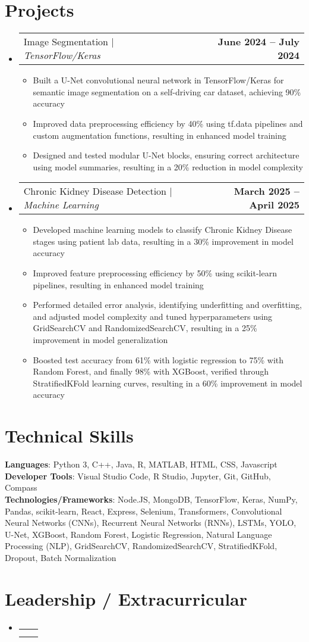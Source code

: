 \documentclass[letterpaper,11pt]{article}
\makeatletter
\newcommand{\resumeItem}[1]{\item\small{#1 \vspace{-2pt}}}
\newcommand{\resumeSubheading}[4]{
  \vspace{-2pt}\item
  \begin{tabular*}{1.0\textwidth}[t]{l@{\extracolsep{\fill}}r}
    \textbf{#1} & \textbf{\small #2} \\
    \textit{\small#3} & \textit{\small #4} \\
  \end{tabular*}\vspace{-7pt}
}
\newcommand{\resumeProjectHeading}[2]{
    \item
    \begin{tabular*}{1.0\textwidth}{l@{\extracolsep{\fill}}r}
      \small#1 & \textbf{\small #2}\\
    \end{tabular*}\vspace{-7pt}
}
\newcommand{\resumeItemListStart}{\begin{itemize}}
\newcommand{\resumeItemListEnd}{\end{itemize}\vspace{-5pt}}
\newcommand{\resumeSubHeadingListStart}{\begin{itemize}[leftmargin=0.0in, label={}]}
\newcommand{\resumeSubHeadingListEnd}{\end{itemize}}
\makeatother
\begin{document}
\section{Projects}
\resumeSubHeadingListStart
  \resumeProjectHeading
      {Image Segmentation | \emph{TensorFlow/Keras}}{June 2024 -- July 2024}
      \resumeItemListStart
        \resumeItem{Built a U-Net convolutional neural network in TensorFlow/Keras for semantic image segmentation on a self-driving car dataset, achieving 90\% accuracy}
        \resumeItem{Improved data preprocessing efficiency by 40\% using tf.data pipelines and custom augmentation functions, resulting in enhanced model training}
        \resumeItem{Designed and tested modular U-Net blocks, ensuring correct architecture using model summaries, resulting in a 20\% reduction in model complexity}
      \resumeItemListEnd
  \resumeProjectHeading
      {Chronic Kidney Disease Detection | \emph{Machine Learning}}{March 2025 -- April 2025}
      \resumeItemListStart
        \resumeItem{Developed machine learning models to classify Chronic Kidney Disease stages using patient lab data, resulting in a 30\% improvement in model accuracy}
        \resumeItem{Improved feature preprocessing efficiency by 50\% using scikit-learn pipelines, resulting in enhanced model training}
        \resumeItem{Performed detailed error analysis, identifying underfitting and overfitting, and adjusted model complexity and tuned hyperparameters using GridSearchCV and RandomizedSearchCV, resulting in a 25\% improvement in model generalization}
        \resumeItem{Boosted test accuracy from 61\% with logistic regression to 75\% with Random Forest, and finally 98\% with XGBoost, verified through StratifiedKFold learning curves, resulting in a 60\% improvement in model accuracy}
      \resumeItemListEnd
\resumeSubHeadingListEnd

\section{Technical Skills}
\begin{itemize}[leftmargin=0.15in, label={}]
    \small{\item{
     \textbf{Languages}{: Python 3, C++, Java, R, MATLAB, HTML, CSS, Javascript} \\
     \textbf{Developer Tools}{: Visual Studio Code, R Studio, Jupyter, Git, GitHub, Compass} \\
     \textbf{Technologies/Frameworks}{: Node.JS, MongoDB, TensorFlow, Keras, NumPy, Pandas, scikit-learn, React, Express, Selenium, Transformers, Convolutional Neural Networks (CNNs), Recurrent Neural Networks (RNNs), LSTMs, YOLO, U-Net, XGBoost, Random Forest, Logistic Regression, Natural Language Processing (NLP), GridSearchCV, RandomizedSearchCV, StratifiedKFold, Dropout, Batch Normalization} \\
    }}
\end{itemize}

\section{Leadership / Extracurricular}
\resumeSubHeadingListStart
  \resumeSubheading
    {}{}{}{}
    \resumeItemListStart
    \resumeItemListEnd
\resumeSubHeadingListEnd
\end{document}
